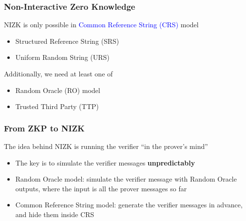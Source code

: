 \documentclass{beamer}
\newcommand{\blue}[1]{\textcolor{blue}{#1}}
\begin{document}
\frame
{
  \frametitle{Non-Interactive Zero Knowledge}
  \onslide<+-> NIZK is only possible in \blue{Common Reference String (CRS)} model
  \begin{itemize}
    \item<+-> Structured Reference String (SRS)
    \item<+-> Uniform Random String (URS)
  \end{itemize}
  \onslide<+-> Additionally, we need at least one of
  \begin{itemize}
    \item<+-> Random Oracle (RO) model
    \item<+-> Trusted Third Party (TTP)
  \end{itemize}

%
%
}

{
  \frametitle{From ZKP to NIZK}

  \onslide<+-> The idea behind NIZK is running the verifier ``in the prover's mind''

  \begin{itemize}
    \item<+-> The key is to simulate the verifier messages \textbf{unpredictably}
    \item<+-> Random Oracle model: simulate the verifier message with Random Oracle outputs, where the input is all the prover messages so far
    \item<+-> Common Reference String model: generate the verifier messages in advance, and hide them inside CRS
  \end{itemize}
}

\end{document}
